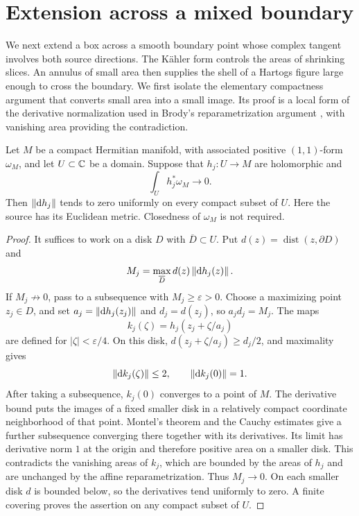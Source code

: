 \section{Extension across a mixed boundary}\label{sec:boundary}

We next extend a box across a smooth boundary point whose complex tangent
involves both source directions.  The K\"ahler form controls the areas of
shrinking slices.  An annulus of small area then supplies the shell of a
Hartogs figure large enough to cross the boundary.  We first isolate the
elementary compactness argument that converts small area into a small
image. Its proof is a local form of the derivative normalization used in
Brody's reparametrization argument \cite{Brody78}, with vanishing area
providing the contradiction.

\begin{lemma}\label{lem:small-area}
Let $M$ be a compact Hermitian manifold, with associated positive
$(1,1)$-form $\omega_M$, and let $U\subset\mathbb C$ be a domain.  Suppose that
$h_j:U\to M$ are holomorphic and
\[
  \int_U h_j^*\omega_M\longrightarrow 0.
\]
Then $\left\lVert\mathrm d h_j\right\rVert$ tends to zero uniformly on every compact subset of $U$.
Here the source has its Euclidean metric.  Closedness of $\omega_M$ is not
required.
\end{lemma}

\begin{proof}
It suffices to work on a disk $D$ with $\overline D\subset U$.  Put
$d(z)=\operatorname{dist}(z,\partial D)$ and
\[
  M_j=\max_{\overline D}d(z)\left\lVert\mathrm d h_j(z)\right\rVert.
\]
If $M_j\not\to0$, pass to a subsequence with $M_j\ge\varepsilon>0$.
Choose a maximizing point $z_j\in D$, and set
$a_j=\left\lVert\mathrm d h_j(z_j)\right\rVert$ and $d_j=d(z_j)$, so $a_jd_j=M_j$.
The maps
\[
  k_j(\zeta)=h_j(z_j+\zeta/a_j)
\]
are defined for $|\zeta|<\varepsilon/4$.  On this disk,
$d(z_j+\zeta/a_j)\ge d_j/2$, and maximality gives
\[
  \left\lVert\mathrm d k_j(\zeta)\right\rVert\le2,
  \qquad \left\lVert\mathrm d k_j(0)\right\rVert=1.
\]
After taking a subsequence, $k_j(0)$ converges to a point of $M$.
The derivative bound puts the images of a fixed smaller disk in a
relatively compact coordinate neighborhood of that point.  Montel's
theorem and the Cauchy estimates give a further subsequence converging
there together with its derivatives.  Its limit has derivative norm $1$
at the origin and therefore positive area on a smaller disk.  This
contradicts the vanishing areas of $k_j$, which are bounded by the areas
of $h_j$ and are unchanged by the affine reparametrization.  Thus
$M_j\to0$.  On each smaller disk $d$ is bounded below, so the derivatives
tend uniformly to zero.  A finite covering proves the assertion on any
compact subset of $U$.
\end{proof}

